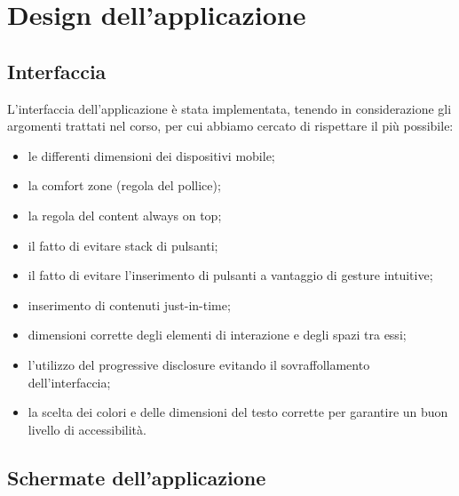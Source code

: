\chapter{Design dell'applicazione\label{sec:design}}

\section{Interfaccia\label{sec:interfaccia}}
L'interfaccia dell'applicazione è stata implementata, tenendo in considerazione gli argomenti trattati nel corso, per cui abbiamo cercato di rispettare il più possibile:
\begin{itemize}[noitemsep,topsep=0pt]
\item le differenti dimensioni dei dispositivi mobile;
\item la comfort zone (regola del pollice);
\item la regola del content always on top;
\item il fatto di evitare stack di pulsanti;
\item il fatto di evitare l'inserimento di pulsanti a vantaggio di gesture intuitive;
\item inserimento di contenuti just-in-time;
\item dimensioni corrette degli elementi di interazione e degli spazi tra essi;
\item l'utilizzo del progressive disclosure evitando il sovraffollamento dell'interfaccia;
\item la scelta dei colori e delle dimensioni del testo corrette per garantire un buon livello di accessibilità.
\end{itemize}
\section{Schermate dell'applicazione\label{sec:schermate}}
